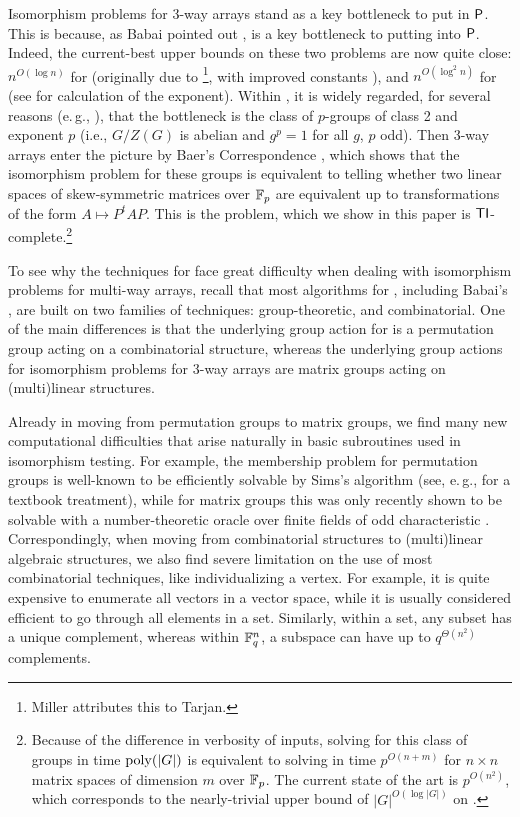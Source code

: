 Isomorphism problems for 3-way arrays 
stand as a key bottleneck to put \GI in $\mathsf{P}$. 
This is because, as Babai 
pointed out 
\cite{Bab16}, \GpIlong is a key bottleneck to putting \GI into $\mathsf{P}$. 
Indeed, the current-best upper bounds on these two problems are now quite 
close: $n^{O(\log n)}$ for \GpIlong (originally due to \cite{FN70, 
Mil78}\footnote{Miller attributes this to 
Tarjan.}, with improved constants   
\cite{Wil14, Ros13a, Ros13b}), 
and 
$n^{O(\log^2 n)}$ for \GI \cite{Bab16} (see \cite{HBD17} for calculation of the exponent). 
Within \GpIlong, it is 
widely regarded, for several reasons 
(e.\,g., \cite{Bae38, HigmanEnum, SergeichukPgpWild, WilsonWildSlides}), that the 
bottleneck is the class of $p$-groups 
of class 2 and exponent $p$ (i.e., $G/Z(G)$ is abelian and $g^p=1$ for all $g$, 
$p$ odd). 
Then 3-way arrays enter the picture by Baer's Correspondence 
\cite{Bae38}, which shows that the isomorphism problem for these groups is 
equivalent to 
telling whether two linear spaces of skew-symmetric matrices over $\mathbb{F}_p$ are 
equivalent up to transformations of the form $A \mapsto P^t A P$. This is the 
\AltMatSpIsomlong problem, which we show in this paper is 
$\mathsf{TI}$-complete.\footnote{Because of the difference in verbosity of inputs, 
solving \GpIlong for this class of groups in time $\mathrm{poly}(|G|)$ 
is equivalent  to solving \AltMatSpIsomlong in time $p^{O(n+m)}$ for $n\times n$ matrix 
spaces of dimension $m$ over $\mathbb{F}_p$. The current state of the art is 
$p^{O(n^2)}$, which corresponds to the nearly-trivial upper bound of $|G|^{O(\log 
|G|)}$ on \GpIlong.}

To see why the techniques for \GI face great difficulty when dealing with 
isomorphism problems for multi-way arrays, recall that
most algorithms for \GI, including Babai's  
\cite{Bab16}, 
are built on 
two families of techniques: group-theoretic, and combinatorial. 
One of the main differences is 
that the underlying group 
action for \GI is a permutation group acting on a combinatorial structure, whereas 
the underlying group actions for isomorphism problems for 3-way arrays are matrix 
groups acting on (multi)linear structures. 

Already in moving from permutation groups to matrix groups, we find many new
computational difficulties 
 that arise naturally in basic subroutines used in isomorphism testing. For 
 example, the membership problem for 
permutation groups is well-known to be efficiently solvable by Sims's algorithm 
\cite{Sim78} (see, e.\,g., \cite{Ser03} for a textbook treatment),
while for matrix groups this was only recently 
shown to be 
solvable with a number-theoretic 
oracle over finite fields of odd characteristic 
\cite{BBS09}. 
Correspondingly, 
when moving from combinatorial structures to (multi)linear 
algebraic structures, we also find severe limitation on 
the use of most combinatorial techniques, like individualizing a vertex. For example,  
it is quite expensive to 
enumerate all 
vectors in a vector space, while it is usually considered efficient to go through 
all 
elements in a set. 
Similarly, within a set, any subset has a unique complement, whereas within 
$\mathbb{F}_q^n$, a subspace can have up to $q^{\Theta(n^2)}$ complements. 


